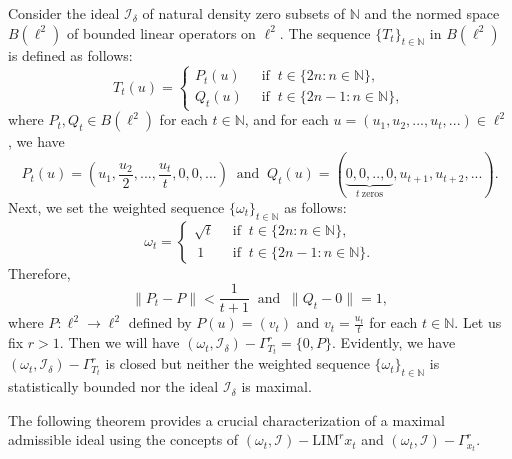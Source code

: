 \documentclass[reqno]{amsart}
\begin{document}
{	\begin{example}
	Consider the ideal $\mathcal{I}_{\delta}$ of natural density zero subsets of $\mathbb{N}$ and the normed space $B(\ell^2)$ of bounded linear operators on $\ell^2$. 
	The sequence $\{T_t\}_{t\in\mathbb{N}}$ in $B(\ell^2)$  is defined as follows:
	$$T_t(u)=
	\begin{cases}
		P_{t}(u) &~\mbox{ if }~t\in\{2n:n\in\mathbb{N}\},\\ 
		Q_t(u) &~\mbox{ if }~ t\in\{2n-1:n\in\mathbb{N}\},
	\end{cases}$$  
	where  $P_t,Q_t\in B(\ell^2)$ for each $t\in\mathbb{N}$, and for each $u=(u_1,u_2,...,u_t,...)\in\ell^2$, we have $$P_t(u)=(u_1,\frac{u_2}{2},...,\frac{u_t}{t},0,0,...)~\mbox{ and }~ Q_{t}(u)=(\underbrace{0,0,..,0}_{t~\text{zeros}},u_{t+1},u_{t+2},...).$$ 
	Next, we set the weighted sequence $\{\omega_t\}_{t\in\mathbb{N}}$ as follows:
	$$\omega_t=
	\begin{cases}
		\sqrt{t} &~\mbox{ if }~t\in\{2n:n\in\mathbb{N}\},\\
		~1 &~ \mbox{ if }~t\in\{2n-1:n\in\mathbb{N}\}.
	\end{cases}$$
Therefore,
$$\|P_{t}-P\|<\frac{1}{t+1}~\mbox{ and }~\|Q_t-0\|=1,$$
where $P:\ell^2\to\ell^2$ defined by $P(u)=(v_t)$ and $v_t=\frac{u_t}{t}$ for each $t\in\mathbb{N}$.
Let us fix $r>1$. Then we will have $(\omega_t,\mathcal{I}_{\delta})-\Gamma_{T_t}^r=\{0,P\}$. Evidently, we have $(\omega_t,\mathcal{I}_{\delta})-\Gamma_{T_t}^r$ is closed but neither the weighted sequence $\{\omega_t\}_{t\in\mathbb{N}}$ is statistically bounded nor the ideal $\mathcal{I}_{\delta}$ is maximal. \end{example}






The following theorem provides a crucial characterization of a maximal admissible ideal using the concepts of $(\omega_t,\mathcal{I})-\text{LIM}^{r}x_t$ and $(\omega_t,\mathcal{I})-\Gamma_{x_t}^r$.


}
\end{document}
